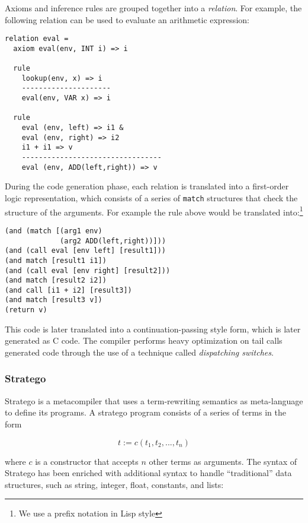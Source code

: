 Axioms and inference rules are grouped together into a \textit{relation}. For example, the following relation can be used to evaluate an arithmetic expression:

\begin{lstlisting}
relation eval =
  axiom eval(env, INT i) => i
  
  rule
    lookup(env, x) => i
    ---------------------
    eval(env, VAR x) => i
    
  rule
    eval (env, left) => i1 &
    eval (env, right) => i2
    i1 + i1 => v
    ---------------------------------
    eval (env, ADD(left,right)) => v
\end{lstlisting}

\noindent
During the code generation phase, each relation is translated into a first-order logic representation, which consists of a series of \texttt{match} structures that check the structure of the arguments. For example the rule above would be translated into:\footnote{We use a prefix notation in Lisp style}

\begin{lstlisting}
(and (match [(arg1 env)
             (arg2 ADD(left,right))]))
(and (call eval [env left] [result1]))
(and match [result1 i1])
(and (call eval [env right] [result2]))
(and match [result2 i2])
(and call [i1 + i2] [result3])
(and match [result3 v])
(return v)
\end{lstlisting}

\noindent
This code is later translated into a continuation-passing style form, which is later generated as C code. The compiler performs heavy optimization on tail calls generated code through the use of a technique called \textit{dispatching switches}.

\subsubsection{Stratego}
Stratego \cite{bravenboer2008stratego} is a metacompiler that uses a term-rewriting semantics as meta-language to define its programs. A stratego program consists of a series of terms in the form

\begin{equation*}
t := c(t_{1},t_{2},...,t_{n})
\end{equation*}

\noindent
where $c$ is a constructor that accepts $n$ other terms as arguments. The syntax of Stratego has been enriched with additional syntax to handle ``traditional'' data structures, such as string, integer, float, constants, and lists:

